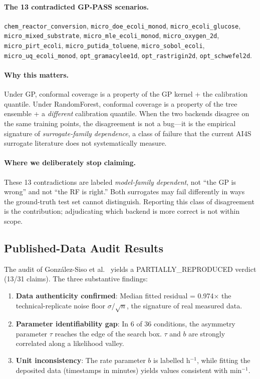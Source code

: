 \documentclass[journal]{IEEEtran}
\begin{document}
\paragraph{The 13 contradicted GP-PASS scenarios.}
\texttt{chem\_reactor\_conversion}, \texttt{micro\_doe\_ecoli\_monod},
\texttt{micro\_ecoli\_glucose}, \texttt{micro\_mixed\_substrate},
\texttt{micro\_mle\_ecoli\_monod}, \texttt{micro\_oxygen_2d},
\texttt{micro\_pirt\_ecoli}, \texttt{micro\_putida\_toluene},
\texttt{micro\_sobol\_ecoli}, \texttt{micro\_uq\_ecoli\_monod},
\texttt{opt\_gramacylee1d}, \texttt{opt\_rastrigin2d},
\texttt{opt\_schwefel2d}.

\paragraph{Why this matters.} Under GP, conformal coverage is a property of
the GP kernel + the calibration quantile. Under RandomForest, conformal
coverage is a property of the tree ensemble + a \textit{different} calibration
quantile. When the two backends disagree on the same training points, the
disagreement is not a bug---it is the empirical signature of
\textit{surrogate-family dependence}, a class of failure that the current AI4S
surrogate literature does not systematically measure.

\paragraph{Where we deliberately stop claiming.} These 13 contradictions are
labeled \textit{model-family dependent}, not ``the GP is wrong'' and not
``the RF is right.'' Both surrogates may fail differently in ways the
ground-truth test set cannot distinguish. Reporting this class of disagreement
is the contribution; adjudicating which backend is more correct is not within
scope.

\subsection{Published-Data Audit Results}
\label{sec:audit}

The audit of Gonz\'alez-Siso et al.\ \cite{gonzalezsiso2026} yields a
PARTIALLY\_REPRODUCED verdict (13/31 claims). The three substantive findings:

\begin{enumerate}
    \item \textbf{Data authenticity confirmed}: Median fitted residual =
    0.974$\times$ the technical-replicate noise floor $\sigma/\sqrt{n}$, the
    signature of real measured data.
    \item \textbf{Parameter identifiability gap}: In 6 of 36 conditions, the
    asymmetry parameter $\tau$ reaches the edge of the search box. $\tau$ and
    $b$ are strongly correlated along a likelihood valley.
    \item \textbf{Unit inconsistency}: The rate parameter $b$ is labelled
    h$^{-1}$, while fitting the deposited data (timestamps in minutes) yields
    values consistent with min$^{-1}$.
\end{enumerate}
\end{document}
